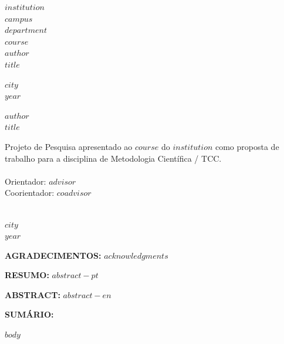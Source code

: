 \documentclass[
  12pt,
  oneside,
  a4paper,
  english,portuguese
]{abntex2}
\begin{document}
\begin{center}
    {\bfseries
    $institution$ \\
    $campus$ \\
    $department$ \\
    $course$
    } \\[2.5cm]

    {\bfseries
    $author$
    } \\[4cm]

    {\bfseries
    $title$
    } \\[9cm]

    \vfill

    {\bfseries
    $city$ \\
    $year$
    }
\end{center}

\newpage

\begin{center}
    {\bfseries
    $author$
    } \\[4cm]

    {\bfseries
    $title$
    } \\[3cm]

    \hspace{.45\textwidth}
    \begin{minipage}{.5\textwidth}
        Projeto de Pesquisa apresentado ao $course$ do $institution$ como proposta de trabalho para a disciplina de Metodologia Científica / TCC.
        \\ \\
        Orientador: $advisor$
        \\ Coorientador: $coadvisor$
    \end{minipage}
    \\[4cm]

    {\bfseries
    $city$ \\
    $year$
    }
\end{center}

\newpage

\noindent\textbf{AGRADECIMENTOS:}
\vspace{\onelineskip}
$acknowledgments$
\newpage

\noindent\textbf{RESUMO:}
\vspace{\onelineskip}
$abstract-pt$
\newpage

\noindent\textbf{ABSTRACT:}
\vspace{\onelineskip}
$abstract-en$
\newpage

\noindent\textbf{SUMÁRIO:}
\vspace{\onelineskip}
\begingroup
\renewcommand{\contentsname}{}
\tableofcontents
\endgroup
\newpage

\mainmatter
$body$



\end{document}
